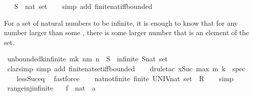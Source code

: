 \begin{isabellebody}
\ \ \ S\ {\isacharcolon}{\isacharcolon}\ {\isachardoublequoteopen}nat\ set{\isachardoublequoteclose}\isanewline
%
\isadelimproof
\ \ %
\endisadelimproof
%
\isatagproof
{}\isamarkupfalse%
\ {\isacharparenleft}simp\ add{\isacharcolon}\ finite{\isacharunderscore}nat{\isacharunderscore}iff{\isacharunderscore}bounded{\isacharparenright}%
\endisatagproof
{\isafoldproof}%
%
\isadelimproof
%
\endisadelimproof
%
\begin{isamarkuptext}%
For a set of natural numbers to be infinite, it is enough to know
  that for any number larger than some , there is some larger
  number that is an element of the set.%
\end{isamarkuptext}\isamarkuptrue%
\isamarkupfalse%
\ unbounded{\isacharunderscore}k{\isacharunderscore}infinite{\isacharcolon}\ {\isachardoublequoteopen}{\isasymforall}m{\isachargreater}k{\isachardot}\ {\isasymexists}n{\isachargreater}m{\isachardot}\ n\ {\isasymin}\ S\ {\isasymLongrightarrow}\ infinite\ {\isacharparenleft}S{\isacharcolon}{\isacharcolon}nat\ set{\isacharparenright}{\isachardoublequoteclose}\isanewline
%
\isadelimproof
\ \ %
\endisadelimproof
%
\isatagproof
{}\isamarkupfalse%
\ {\isacharparenleft}clarsimp\ simp\ add{\isacharcolon}\ finite{\isacharunderscore}nat{\isacharunderscore}set{\isacharunderscore}iff{\isacharunderscore}bounded{\isacharparenright}\isanewline
\ \ \isamarkupfalse%
\ {\isacharparenleft}drule{\isacharunderscore}tac\ x{\isacharequal}{\isachardoublequoteopen}Suc\ {\isacharparenleft}max\ m\ k{\isacharparenright}{\isachardoublequoteclose}\ \ spec{\isacharparenright}\isanewline
\ \ \isamarkupfalse%
\ less{\isacharunderscore}Suc{\isacharunderscore}eq\ \isamarkupfalse%
\ fastforce\isanewline
\ \ \isamarkupfalse%
%
\endisatagproof
{\isafoldproof}%
%
\isadelimproof
\isanewline
%
\endisadelimproof
\isanewline
{}\isamarkupfalse%
\ nat{\isacharunderscore}not{\isacharunderscore}finite{\isacharcolon}\ {\isachardoublequoteopen}finite\ {\isacharparenleft}UNIV{\isacharcolon}{\isacharcolon}nat\ set{\isacharparenright}\ {\isasymLongrightarrow}\ R{\isachardoublequoteclose}\isanewline
%
\isadelimproof
\ \ %
\endisadelimproof
%
\isatagproof
{}\isamarkupfalse%
\ simp%
\endisatagproof
{\isafoldproof}%
%
\isadelimproof
\isanewline
%
\endisadelimproof
\isanewline
{}\isamarkupfalse%
\ range{\isacharunderscore}inj{\isacharunderscore}infinite{\isacharcolon}\isanewline
\ \ \ f\ {\isacharcolon}{\isacharcolon}\ {\isachardoublequoteopen}nat\ {\isasymRightarrow}\ {\isacharprime}a{\isachardoublequoteclose}\isanewline

\end{isabellebody}
